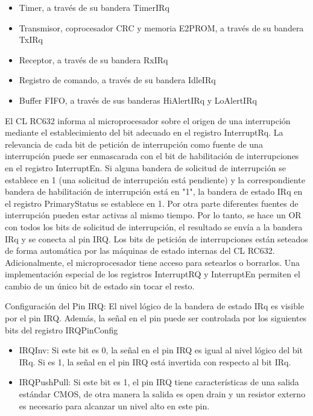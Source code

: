 \begin{itemize}

\item Timer, a través de su bandera TimerIRq 
\item Transmisor, coprocesador CRC y memoria E2PROM, a través de su bandera TxIRq 
\item Receptor, a través de su bandera RxIRq 
\item Registro de comando, a través de su bandera IdleIRq 
\item Buffer FIFO, a través de sus banderas HiAlertIRq y LoAlertIRq 

\end{itemize}

El CL RC632 informa al microprocesador sobre el origen de una interrupción mediante el establecimiento del bit adecuado en el registro InterruptRq. La relevancia de cada bit de petición de interrupción como fuente de una interrupción puede ser enmascarada con el bit de habilitación de interrupciones en el registro InterruptEn. 
Si alguna bandera de solicitud de interrupción se establece en 1 (una solicitud de interrupción está pendiente) y la correspondiente bandera de habilitación de interrupción está en "1", la bandera de estado IRq en el registro PrimaryStatus se establece en 1. 
Por otra parte diferentes fuentes de interrupción pueden estar activas al mismo tiempo. Por lo tanto, se hace un OR con todos los bits de solicitud de interrupción, el resultado se envía a la bandera IRq y se conecta al pin IRQ. 
Los bits de petición de interrupciones están seteados de forma automática por las máquinas de estado internas del CL RC632. Adicionalmente, el microprocesador tiene acceso para setearlos o borrarlos. 
Una implementación especial de los registros InterruptRQ y InterruptEn permiten el cambio de un único bit de estado sin tocar el resto. 

\bigskip
Configuración del Pin IRQ:
El nivel lógico de la bandera de estado IRq es visible por el pin IRQ. Además, la señal en el pin puede ser controlada por los siguientes bits del registro IRQPinConfig 
\begin{itemize}
\item IRQInv: Si este bit es 0, la señal en el pin IRQ es igual al nivel lógico del bit IRq. 
Si es 1, la señal en el pin IRQ está invertida con respecto al bit IRq. 
\item IRQPushPull:  Si este bit es 1, el pin IRQ tiene características de una salida estándar 				   CMOS, de otra manera la salida es open drain y un resistor externo es necesario para alcanzar un nivel alto en este pin. 
\end{itemize}

